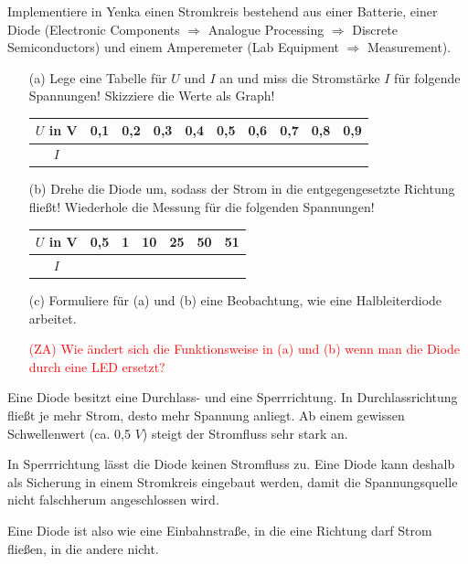 \begin{Aufgabe} \label{Aufg:DiodeTest}
Implementiere in Yenka einen Stromkreis bestehend aus einer Batterie, einer Diode (Electronic Components $\Rightarrow$ Analogue Processing $\Rightarrow$ Discrete Semiconductors) und einem Amperemeter (Lab Equipment $\Rightarrow$ Measurement).


\begin{itemize}
\item[(a)] Lege eine Tabelle für $U$ und $I$ an und miss die  Stromstärke $I$ für folgende Spannungen! Skizziere die Werte als Graph!

\begin{center}
\begin{tabular}{|c|c|c|c|c|c|c|c|c|c|}
\hline
$U$ in V & 0,1 & 0,2 & 0,3 & 0,4 & 0,5 & 0,6 & 0,7 & 0,8 & 0,9  \\ \hline
$I$ &&&&&&&&& \\ \hline
\end{tabular}
\end{center}

\item[(b)] Drehe die Diode um, sodass der Strom in die entgegengesetzte Richtung fließt!
Wiederhole die Messung für die folgenden Spannungen!

\begin{center}
\begin{tabular}{|c|c|c|c|c|c|c|}
\hline
$U$ in V & 0,5 & 1 & 10 & 25 & 50 & 51  \\ \hline
$I$ &&&&&& \\ \hline
\end{tabular}
\end{center}

\item[(c)] Formuliere für (a) und (b) eine Beobachtung, wie eine Halbleiterdiode arbeitet.

\item[\textcolor{red}{(ZA)}] \textcolor{red}{Wie ändert sich die Funktionsweise in (a) und (b) wenn man die Diode durch eine LED ersetzt?}

\end{itemize}
\end{Aufgabe}



\begin{sich}
Eine Diode besitzt eine Durchlass- und eine Sperrrichtung.
In Durchlassrichtung fließt je mehr Strom, desto mehr Spannung anliegt.
Ab einem gewissen Schwellenwert (ca. 0,5 $V$) steigt der Stromfluss sehr stark an.

In Sperrrichtung lässt die Diode keinen Stromfluss zu.
Eine Diode kann deshalb als Sicherung in einem Stromkreis eingebaut werden, damit die Spannungsquelle nicht falschherum angeschlossen wird.

Eine Diode ist also wie eine Einbahnstraße, in die eine Richtung darf Strom fließen, in die andere nicht.
\end{sich}

